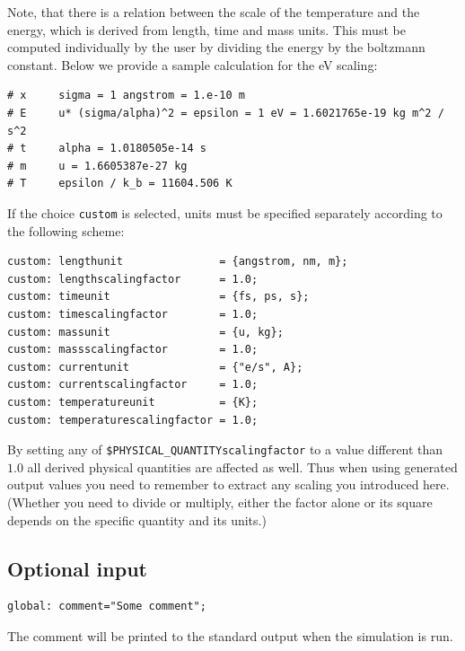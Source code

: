 Note, that there is a relation between the scale of the temperature and the energy, which is derived from length, time and mass units. This must be computed individually by the user by dividing the energy by the boltzmann constant.
Below we provide a sample calculation for the eV scaling:
\begin{lstlisting}
# x     sigma = 1 angstrom = 1.e-10 m
# E     u* (sigma/alpha)^2 = epsilon = 1 eV = 1.6021765e-19 kg m^2 / s^2
# t     alpha = 1.0180505e-14 s
# m     u = 1.6605387e-27 kg
# T     epsilon / k_b = 11604.506 K
\end{lstlisting}


\bigbreak

If the choice \texttt{custom} is selected, units must be specified separately according to the following scheme:

\begin{lstlisting}
custom: lengthunit               = {angstrom, nm, m};
custom: lengthscalingfactor      = 1.0;
custom: timeunit                 = {fs, ps, s};
custom: timescalingfactor        = 1.0;
custom: massunit                 = {u, kg};
custom: massscalingfactor        = 1.0;
custom: currentunit              = {"e/s", A};
custom: currentscalingfactor     = 1.0;
custom: temperatureunit          = {K};
custom: temperaturescalingfactor = 1.0;
\end{lstlisting}

By setting any of \texttt{\$PHYSICAL\_QUANTITYscalingfactor} to a value different than $1.0$ all derived physical quantities are affected as well. Thus when using generated output values you need to remember to extract any scaling you introduced here. (Whether you need to divide or multiply, either the factor alone or its square depends on the specific quantity and its units.)


\subsection{Optional input}
\begin{lstlisting}
global: comment="Some comment";
\end{lstlisting}
The comment will be printed to the standard output when the simulation is run.

